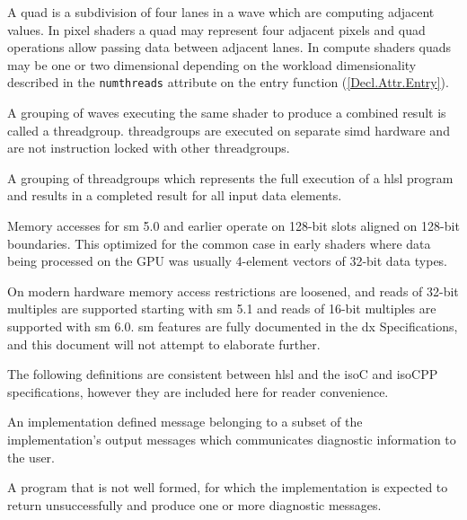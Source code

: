 
\p A \gls{quad} is a subdivision of four \gls{lane}s in a \gls{wave} which are
computing adjacent values. In pixel shaders a \gls{quad} may represent four
adjacent pixels and \gls{quad} operations allow passing data between adjacent
lanes. In compute shaders quads may be one or two dimensional depending on the
workload dimensionality described in the \texttt{numthreads} attribute on the
entry function (\ref{Decl.Attr.Entry}).


\p A grouping of \gls{wave}s executing the same shader to produce a combined
result is called a \gls{threadgroup}. \gls{threadgroup}s are executed on
separate \acrshort{simd} hardware and are not instruction locked with other
\gls{threadgroup}s.


\p A grouping of \gls{threadgroup}s which represents the full execution of a
\acrshort{hlsl} program and results in a completed result for all input data
elements.


\p Memory accesses for \gls{sm} 5.0 and earlier operate on 128-bit slots aligned
on 128-bit boundaries. This optimized for the common case in early shaders where
data being processed on the GPU was usually 4-element vectors of 32-bit data
types.

\p On modern hardware memory access restrictions are loosened, and reads of
32-bit multiples are supported starting with \gls{sm} 5.1 and reads of 16-bit
multiples are supported with \gls{sm} 6.0. \gls{sm} features are fully
documented in the \gls{dx} Specifications, and this document will not attempt to
elaborate further.


\p The following definitions are consistent between \acrshort{hlsl} and the
\gls{isoC} and \gls{isoCPP} specifications, however they are included here for
reader convenience.

\p An implementation defined message belonging to a subset of the
implementation's output messages which communicates diagnostic information to
the user.

\p A program that is not well formed, for which the implementation is expected
to return unsuccessfully and produce one or more diagnostic messages.

